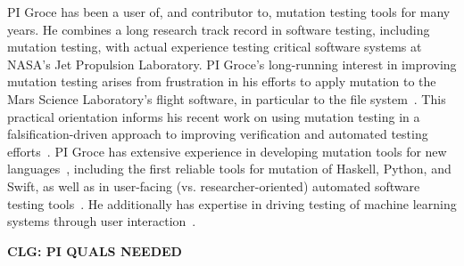 PI Groce has been a user of, and contributor to, mutation testing tools for many years.  He combines a long research track record in software testing, including mutation testing, with actual experience testing critical software systems at NASA's Jet Propulsion Laboratory.  PI Groce's long-running interest in improving mutation testing arises from frustration in his efforts to apply mutation to the  Mars Science Laboratory's flight software, in particular to the file system~\cite{ICSEDiff,CFV08,AMAI}.  This practical orientation informs his recent work on using mutation testing in a falsification-driven approach to improving verification and automated testing efforts~\cite{groce2015verified,groce2018verified,mutKernel}.  PI Groce has extensive experience in developing mutation tools for new languages~\cite{le2014mucheck,muupi,regexpMut}, including the first reliable tools for mutation of Haskell, Python, and Swift, as well as in user-facing (vs. researcher-oriented) automated software testing tools~\cite{tstlsttt,DeepState}.  He additionally has expertise in driving testing of machine learning systems through user interaction~\cite{EndUserMistake,OnlyOracle}.

{\bf CLG:  PI QUALS NEEDED}

